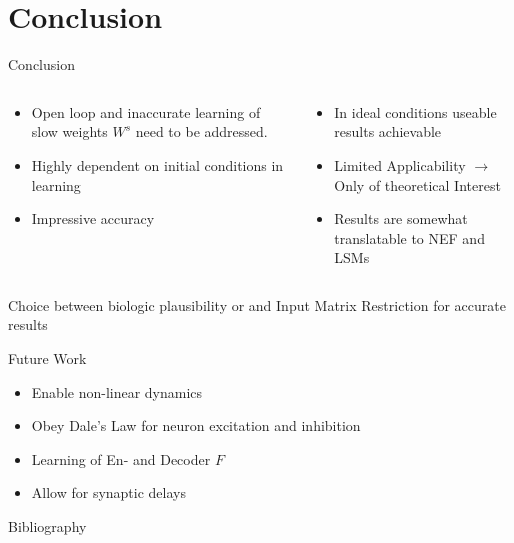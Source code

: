 \documentclass[17pt, t, lualatex]{beamer}
\begin{document}
\section{Conclusion}\insertsectionpage
\begin{frame}{Conclusion}
	\vspace{-1cm}
	\begin{columns}
		\begin{column}{0.45\textwidth}
			\begin{itemize}
				\setlength\itemsep{0.7em}
				\item Open loop and inaccurate learning of slow weights $W^s$ need to be addressed.
				\item Highly dependent on initial conditions in learning
				\item Impressive accuracy
			\end{itemize}
		\end{column}
		\vrule
		\begin{column}{0.45\textwidth}
			\begin{itemize}
				\setlength\itemsep{0.7em}
				\item In ideal conditions useable results achievable
				\item Limited Applicability $\rightarrow$ Only of theoretical Interest
				\item Results are somewhat translatable to NEF and LSMs
			\end{itemize}
		\end{column}
	\end{columns}
	\vspace{0.5cm}
	Choice between biologic plausibility or and Input Matrix Restriction for accurate results
\end{frame}




\begin{frame}{Future Work}
	\begin{itemize}
		\setlength\itemsep{1.5em}
		\item Enable non-linear dynamics
		\item Obey Dale's Law for neuron excitation and inhibition
		\item Learning of En- and Decoder $F$
		\item Allow for synaptic delays
	\end{itemize}
\end{frame}


\AtNextBibliography{\small}
\begin{frame}[allowframebreaks]{Bibliography}
	\printbibliography
\end{frame}
\end{document}

